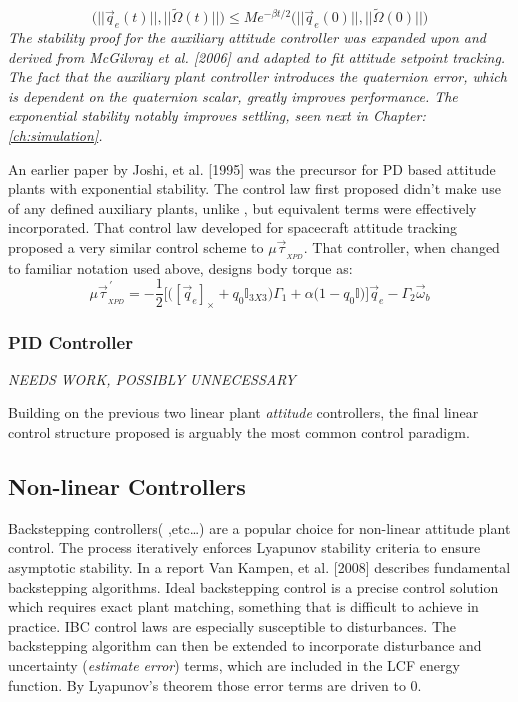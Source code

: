 {\begin{equation}
\big(||\vec{q}_e(t)||,||\widetilde{\Omega}(t)||\big)\leq Me^{-\beta t/2}\big(||\vec{q}_e(0)||,||\widetilde{\Omega}(0)||\big)
\end{equation}
\emph{\color{Gray}The stability proof for the auxiliary attitude controller was expanded upon and derived from McGilvray et al. [2006]\cite{attitudestabilization} and adapted to fit attitude setpoint tracking. The fact that the auxiliary plant controller introduces the quaternion error, which is dependent on the quaternion scalar, greatly improves performance. The exponential stability notably improves settling, seen next in Chapter:\ref{ch:simulation}.}
\par
An earlier paper by Joshi, et al. [1995]\cite{robustattitude} was the precursor for PD based attitude plants with exponential stability. The control law first proposed didn't make use of any defined auxiliary plants, unlike \cite{attitudestabilization}, but equivalent terms were effectively incorporated. That control law developed for spacecraft attitude tracking proposed a very similar control scheme to $\mu\vec{\tau}_{_{XPD}}$. That controller, when changed to familiar notation used above, designs body torque as:
\begin{equation}
\mu\vec{\tau}^{\hspace{2pt}'}_{_{XPD}}=-\frac{1}{2}\bigg[\big([\vec{q}_e]_\times+q_0\mathbb{I}_{3X3}\big)\Gamma_1+\alpha\big(1-q_0\mathbb{I}\big)\bigg]\vec{q}_e-\Gamma_2\vec{\omega}_b
\end{equation} 
\subsubsection{PID Controller}
\emph{\color{Red}NEEDS WORK, POSSIBLY UNNECESSARY}
\par
Building on the previous two linear plant \emph{attitude} controllers, the final linear control structure proposed is arguably the most common control paradigm. 
\newpage
\subsection{Non-linear Controllers}
\label{subsec:control.attitude.nonlinear}
Backstepping controllers(\cite{satellitebackstepping,intelligentbackstep,backstepslidingmode} ,etc\ldots) are a popular choice for non-linear attitude plant control. The process iteratively enforces Lyapunov stability criteria to ensure asymptotic stability. In a report \cite{backstepping} Van Kampen, et al. [2008] describes fundamental backstepping algorithms. Ideal backstepping control is a precise control solution which requires exact plant matching, something that is difficult to achieve in practice. IBC control laws are especially susceptible to disturbances. The backstepping algorithm can then be extended to incorporate disturbance and uncertainty (\emph{estimate error}) terms, which are included in the LCF energy function. By Lyapunov's theorem those error terms are driven to 0.
}
